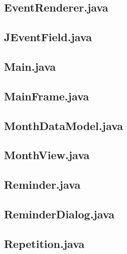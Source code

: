 \documentclass{article}
\begin{document}


\subsection{EventRenderer.java}



\subsection{JEventField.java}



\subsection{Main.java}



\subsection{MainFrame.java}



\subsection{MonthDataModel.java}



\subsection{MonthView.java}



\subsection{Reminder.java}



\subsection{ReminderDialog.java}



\subsection{Repetition.java}
\end{document}
